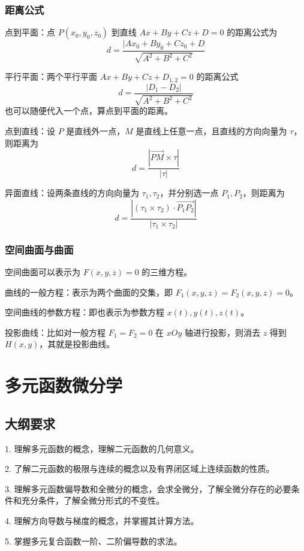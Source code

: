 \subsubsection*{距离公式}

点到平面：点 $P(x_0, y_0, z_0)$ 到直线 $Ax+By+Cz+D =0$ 的距离公式为
\[ d = \frac{|Ax_0 + By_0 + Cz_0 + D}{\sqrt{A^2 + B^2 + C^2}} \]

平行平面：两个平行平面 $Ax+By+Cz+D_{1,2} = 0$ 的距离公式
\[ d = \frac{|D_1 - D_2|}{\sqrt{A^2 + B^2 + C^2}} \]
也可以随便代入一个点，算点到平面的距离。

点到直线：设 $P$ 是直线外一点，$M$ 是直线上任意一点，且直线的方向向量为 $\tau$，则距离为
\[ d = \frac{|\overrightarrow{PM} \times \tau|}{|\tau|} \]

异面直线：设两条直线的方向向量为 $\tau_1, \tau_2$，并分别选一点 $P_1, P_2$，则距离为
\[ d = \frac{|(\tau_1 \times \tau_2) \cdot \overrightarrow{P_1P_2}|}{|\tau_1 \times \tau_2|} \]

\subsubsection*{空间曲面与曲面}

空间曲面可以表示为 $F(x, y, z) = 0$ 的三维方程。

曲线的一般方程：表示为两个曲面的交集，即 $F_1(x,y,z) = F_2(x, y,z) = 0$。

空间曲线的参数方程：即也表示为参数方程 $x(t), y(t), z(t)$。

投影曲线：比如对一般方程 $F_1 = F_2 = 0$ 在 $xOy$ 轴进行投影，则消去 $z$ 得到 $H(x, y)$，其就是投影曲线。

\section{多元函数微分学}

\subsection{大纲要求}

1. 理解多元函数的概念，理解二元函数的几何意义。

2. 了解二元函数的极限与连续的概念以及有界闭区域上连续函数的性质。

3. 理解多元函数偏导数和全微分的概念，会求全微分，了解全微分存在的必要条件和充分条件，了解全微分形式的不变性。

4. 理解方向导数与梯度的概念，并掌握其计算方法。

5. 掌握多元复合函数一阶、二阶偏导数的求法。

